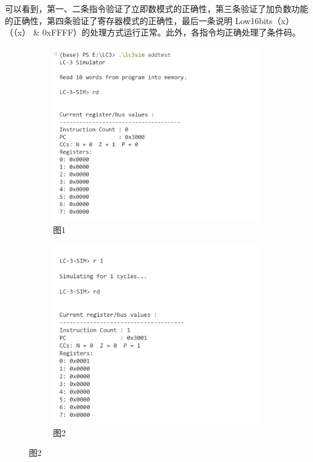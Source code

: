 \documentclass[UTF8]{ctexart}
\begin{document}
可以看到，第一、二条指令验证了立即数模式的正确性，第三条验证了加负数功能的正确性，第四条验证了寄存器模式的正确性，最后一条说明 Low16bits（x） （（x） \& 0xFFFF）的处理方式运行正常。此外，各指令均正确处理了条件码。
\begin{figure}[htbp]
  \centering
  \begin{subfigure}{0.45\textwidth}
    \includegraphics[width=\linewidth]{add1.png}
    \caption{图1}
  \end{subfigure}
  \hfill
  \begin{subfigure}{0.45\textwidth}
    \includegraphics[width=\linewidth]{add2.png}
    \caption{图2}
  \end{subfigure}


\end{figure}
\end{document}
